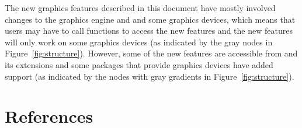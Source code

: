 The new graphics features described in this document have mostly involved
changes to the graphics engine and  and some
graphics devices, which means that users may have to call 
functions to access the new features and the new features will only
work on some graphics devices
(as indicated by the gray nodes in Figure~\ref{fig:structure}).
However, some of the new features are accessible from 
and its extensions and some packages that provide graphics devices
have added support (as indicated by the nodes with gray gradients
in Figure~\ref{fig:structure}).

\hypertarget{references}{%
\section*{References}\label{references}}

